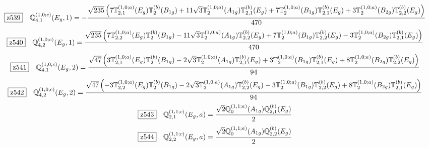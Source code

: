 \documentclass[fleqn,10pt,landscape]{jsarticle}
\begin{document}
\begin{dmath*}
\hspace*{3mm}\fbox{z539}\quad \mathbb{Q}_{4,1}^{(1,0;c)}(E_{g},1)=- \frac{\sqrt{235} \left(7 \mathbb{T}_{2,1}^{(1,0;a)}(E_{g}) \mathbb{T}_{2}^{(b)}(B_{1g}) + 11 \sqrt{3} \mathbb{T}_{2}^{(1,0;a)}(A_{1g}) \mathbb{T}_{2,1}^{(b)}(E_{g}) + 7 \mathbb{T}_{2}^{(1,0;a)}(B_{1g}) \mathbb{T}_{2,1}^{(b)}(E_{g}) + 3 \mathbb{T}_{2}^{(1,0;a)}(B_{2g}) \mathbb{T}_{2,2}^{(b)}(E_{g})\right)}{470}
\end{dmath*}
\begin{dmath*}
\hspace*{3mm}\fbox{z540}\quad \mathbb{Q}_{4,2}^{(1,0;c)}(E_{g},1)=\frac{\sqrt{235} \left(7 \mathbb{T}_{2,2}^{(1,0;a)}(E_{g}) \mathbb{T}_{2}^{(b)}(B_{1g}) - 11 \sqrt{3} \mathbb{T}_{2}^{(1,0;a)}(A_{1g}) \mathbb{T}_{2,2}^{(b)}(E_{g}) + 7 \mathbb{T}_{2}^{(1,0;a)}(B_{1g}) \mathbb{T}_{2,2}^{(b)}(E_{g}) - 3 \mathbb{T}_{2}^{(1,0;a)}(B_{2g}) \mathbb{T}_{2,1}^{(b)}(E_{g})\right)}{470}
\end{dmath*}
\begin{dmath*}
\hspace*{3mm}\fbox{z541}\quad \mathbb{Q}_{4,1}^{(1,0;c)}(E_{g},2)=\frac{\sqrt{47} \left(3 \mathbb{T}_{2,1}^{(1,0;a)}(E_{g}) \mathbb{T}_{2}^{(b)}(B_{1g}) - 2 \sqrt{3} \mathbb{T}_{2}^{(1,0;a)}(A_{1g}) \mathbb{T}_{2,1}^{(b)}(E_{g}) + 3 \mathbb{T}_{2}^{(1,0;a)}(B_{1g}) \mathbb{T}_{2,1}^{(b)}(E_{g}) + 8 \mathbb{T}_{2}^{(1,0;a)}(B_{2g}) \mathbb{T}_{2,2}^{(b)}(E_{g})\right)}{94}
\end{dmath*}
\begin{dmath*}
\hspace*{3mm}\fbox{z542}\quad \mathbb{Q}_{4,2}^{(1,0;c)}(E_{g},2)=\frac{\sqrt{47} \left(- 3 \mathbb{T}_{2,2}^{(1,0;a)}(E_{g}) \mathbb{T}_{2}^{(b)}(B_{1g}) - 2 \sqrt{3} \mathbb{T}_{2}^{(1,0;a)}(A_{1g}) \mathbb{T}_{2,2}^{(b)}(E_{g}) - 3 \mathbb{T}_{2}^{(1,0;a)}(B_{1g}) \mathbb{T}_{2,2}^{(b)}(E_{g}) + 8 \mathbb{T}_{2}^{(1,0;a)}(B_{2g}) \mathbb{T}_{2,1}^{(b)}(E_{g})\right)}{94}
\end{dmath*}
\begin{dmath*}
\hspace*{3mm}\fbox{z543}\quad \mathbb{Q}_{2,1}^{(1,1;c)}(E_{g},a)=\frac{\sqrt{2} \mathbb{Q}_{0}^{(1,1;a)}(A_{1g}) \mathbb{Q}_{2,1}^{(b)}(E_{g})}{2}
\end{dmath*}
\begin{dmath*}
\hspace*{3mm}\fbox{z544}\quad \mathbb{Q}_{2,2}^{(1,1;c)}(E_{g},a)=\frac{\sqrt{2} \mathbb{Q}_{0}^{(1,1;a)}(A_{1g}) \mathbb{Q}_{2,2}^{(b)}(E_{g})}{2}
\end{dmath*}
\end{document}
